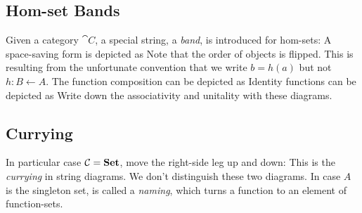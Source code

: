 \subsection{Hom-set Bands}

Given a category $\cat{C}$, a special string, a \textit{band}, is introduced for hom-sets:
A space-saving form is depicted as
Note that the order of objects is flipped. %
This is resulting from the unfortunate convention that we write $b = h(a)$ but not $h : B \leftarrow A$.
\mynewline
The function composition can be depicted as
\mynewline
Identity functions can be depicted as
Write down the associativity and unitality with these diagrams. 


\subsection{Currying}

In particular case $\mathcal{C} = \boldsymbol{\mathrm{Set}}$, move the right-side leg up and down:
This is the \textit{currying} in string diagrams. %
We don't distinguish these two diagrams.
\mynewline
In case $A$ is the singleton set,
is called a \textit{naming}, which turns a function to an element of function-sets.


